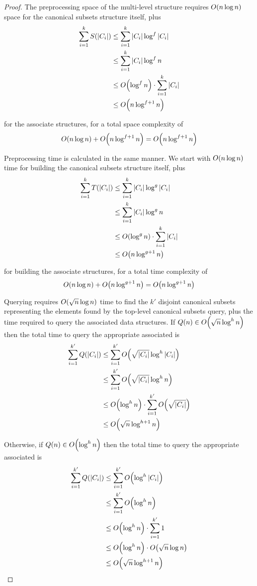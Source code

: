 \begin{proof}
The preprocessing space of the multi-level structure requires $O\!\left(n \log{n}\right)$ space for the canonical subsets structure itself, plus
\[
\begin{split}
\sum_{i=1}^k{S(|C_i|)}
&\leq \sum_{i=1}^k{|C_i| \log^f{|C_i|}} \\
%
&\leq \sum_{i=1}^k{|C_i| \log^f{n}} \\
%
&\leq \BigOh{\log^f{n}} \cdot \sum_{i=1}^k{|C_i|} \\
%
&\leq \BigOh{n\log^{f+1}{n}}
\end{split}
\]

\noindent for the associate structures, for a total space complexity of
\[
O\!\left(n \log{n}\right) + O\!\left(n\log^{f+1}{n}\right) = O\!\left(n\log^{f+1}{n}\right)
\]

Preprocessing time is calculated in the same manner. 
We start with $O\!\left(n \log{n}\right)$ time for building the canonical subsets structure itself, plus
\[
\begin{split}
\sum_{i=1}^k{T(|C_i|)}
&\leq \sum_{i=1}^k{|C_i| \log^g{|C_i|}} \\
%
&\leq \sum_{i=1}^k{|C_i| \log^g{n}} \\
%
&\leq \BigOh{\log^g{n}} \cdot \sum_{i=1}^k{|C_i|} \\
%
&\leq \BigOh{n\log^{g+1}{n}}
\end{split}
\]

\noindent for building the associate structures, for a total time complexity of 
\[
O\!\left(n \log{n}\right) + O\!\left(n\log^{g+1}{n}\right) = O\!\left(n\log^{g+1}{n}\right)
\]

Querying requires $O\!\left(\sqrt{n}\log{n}\right)$ time to find the $k'$ disjoint canonical subsets representing the elements found by the top-level canonical subsets query, plus the time required to query the associated data structures.  If $Q(n) \in O\!\left(\sqrt{n}\log^h{n}\right)$ then the total time to query the appropriate associated is
\[
\begin{split}
\sum_{i=1}^{k'}{Q(|C_i|)}
&\leq \sum_{i=1}^{k'}{\BigOh{\sqrt{|C_i|}\log^h{|C_i|}}} \\
%
&\leq \sum_{i=1}^{k'}{\BigOh{\sqrt{|C_i|}\log^h{n}}} \\
%
&\leq \BigOh{\log^h{n}} \cdot \sum_{i=1}^{k'}{\BigOh{\sqrt{|C_i|}}} \\
%
&\leq \BigOh{\sqrt{n}\log^{h+1}{n}} \\
\end{split}
\]

\noindent Otherwise, if $Q(n) \in O\!\left(\log^h{n}\right)$ then the total time to query the appropriate associated is
\[
\begin{split}
\sum_{i=1}^{k'}{Q(|C_i|)}
&\leq \sum_{i=1}^{k'}{\BigOh{\log^h{|C_i|}}} \\
%
&\leq \sum_{i=1}^{k'}{\BigOh{\log^h{n}}} \\
%
&\leq \BigOh{\log^h{n}} \cdot \sum_{i=1}^{k'}{1} \\
%
&\leq \BigOh{\log^h{n}} \cdot \BigOh{\sqrt{n}\log{n}}\\
%
&\leq \BigOh{\sqrt{n}\log^{h+1}{n}} \\
\end{split}
\]


\end{proof}
